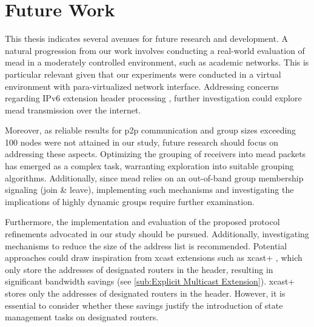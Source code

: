 \section{Future Work} %
\label{sec:Further Work}
This thesis indicates several avenues for future research and development.
A natural progression from our work involves conducting a real-world evaluation
    of \gls{mead} in a moderately controlled environment, such as academic
    networks.
This is particular relevant given that our experiments were conducted in a
    virtual environment with para-virtualized network interface.
Addressing concerns regarding IPv6 extension header processing
    \cite{rfc7872_ext_hdrs_drop_rate}, further investigation could explore
    \gls{mead} transmission over the internet.

Moreover, as reliable results for \gls{p2p} communication and group sizes
    exceeding 100 nodes were not attained in our study, future research should
    focus on addressing these aspects.
Optimizing the grouping of receivers into \gls{mead} packets has emerged as a
    complex task, warranting exploration into suitable grouping algorithms.
Additionally, since \gls{mead} relies on an out-of-band group membership
    signaling (join \& leave), implementing such mechanisms and investigating 
    the implications of highly dynamic groups require further examination.

Furthermore, the implementation and evaluation of the proposed protocol
    refinements advocated in our study should be pursued.
Additionally, investigating mechanisms to reduce the size of the address list
    is recommended.
Potential approaches could draw inspiration from \gls{xcast} extensions such
    as \gls{xcast+} \cite{xcast+}, which only store the addresses of designated
    routers in the header, resulting in significant bandwidth savings (see
    \autoref{sub:Explicit Multicast Extension}).
\gls{xcast+} stores only the addresses of designated routers in the header.
However, it is essential to consider whether these savings justify the
    introduction of state management tasks on designated routers.


